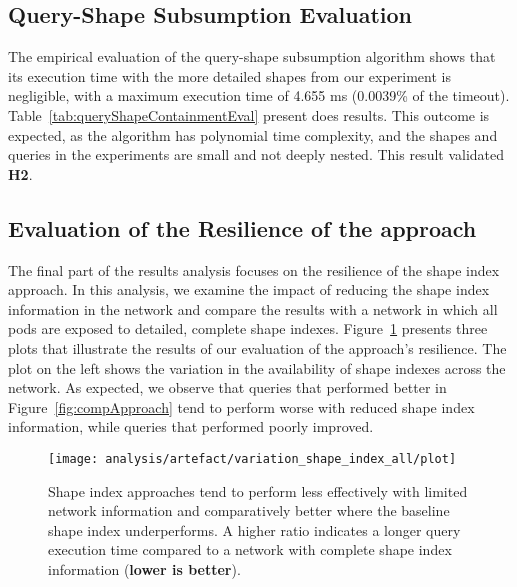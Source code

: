 
\subsection{Query-Shape Subsumption Evaluation} \label{sec:experimentAlgoSubsumption}

The empirical evaluation of the query-shape subsumption algorithm shows that its execution time with the more detailed shapes from our experiment is negligible, with a maximum execution time of 4.655 ms (0.0039\% of the timeout).
Table~\ref{tab:queryShapeContainmentEval} present does results.
This outcome is expected, as the algorithm has polynomial time complexity, and the shapes and queries in the experiments are small and not deeply nested.
This result validated \textbf{H2}.


\subsection{Evaluation of the Resilience of the approach}

The final part of the results analysis focuses on the resilience of the shape index approach.
In this analysis, we examine the impact of reducing the shape index information in the network and compare the results with a network in which all pods are exposed to detailed, complete shape indexes.
Figure~\ref{fig:adaptShapeIndex} presents three plots that illustrate the results of our evaluation of the approach's resilience.
The plot on the left shows the variation in the availability of shape indexes across the network. 
As expected, we observe that queries that performed better in Figure~\ref{fig:compApproach} tend to perform worse with reduced shape index information, while queries that performed poorly improved. 


\begin{figure}
    \centering
    \texttt{[image: analysis/artefact/variation\_shape\_index\_all/plot]}
    \caption{
    Shape index approaches tend to perform less effectively with limited network information and comparatively better where the baseline shape index underperforms.
    A higher ratio indicates a longer query execution time compared to a network with complete shape index information (\textbf{lower is better}).
    }
    \label{fig:adaptShapeIndex}
\end{figure}



